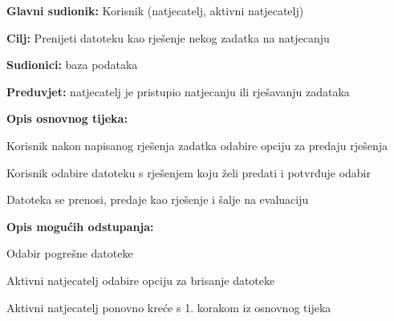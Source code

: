 					\noindent {}
					\begin{packed_item}
						
						\item \textbf{Glavni sudionik: }Korisnik (natjecatelj, aktivni natjecatelj)
						\item \textbf{Cilj:} Prenijeti datoteku kao rješenje nekog zadatka na natjecanju
						\item \textbf{Sudionici:} baza podataka
						\item \textbf{Preduvjet:} natjecatelj je pristupio natjecanju ili rješavanju zadataka
						\item \textbf{Opis osnovnog tijeka:}
						
						\item[] \begin{packed_enum}
							\item Korisnik nakon napisanog rješenja zadatka odabire opciju za predaju rješenja
							\item Korisnik odabire datoteku s rješenjem koju želi predati i potvrđuje odabir
							\item Datoteka se prenosi, predaje kao rješenje i šalje na evaluaciju
						\end{packed_enum}
						
							\item  \textbf{Opis mogućih odstupanja:}
							
							\item[] \begin{packed_item}
								
								\item[2.a] Odabir pogrešne datoteke
								\item[] \begin{packed_enum}
									
									\item Aktivni natjecatelj odabire opciju za brisanje datoteke 
									\item Aktivni natjecatelj ponovno kreće s 1. korakom iz osnovnog tijeka
																
								\end{packed_enum}
							\end{packed_item}
						\end{packed_item}
									
									
					
